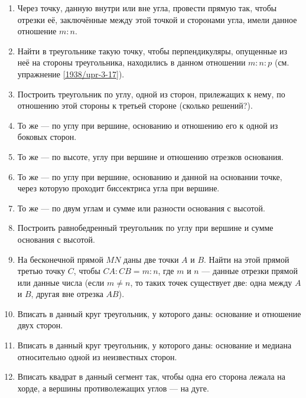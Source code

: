 \documentclass[oneside]{book}
\begin{document}
\begin{enumerate}[resume]

 \item
Через точку, данную внутри или вне угла, провести прямую так, чтобы отрезки её, заключённые между этой точкой и сторонами угла, имели данное отношение $m:n$.

 \item
Найти в треугольнике такую точку, чтобы перпендикуляры, опущенные из неё на стороны треугольника, находились в данном отношении $m:n:p$ (см. упражнение \ref{1938/upr-3-17}).

 \item
Построить треугольник по углу, одной из сторон, прилежащих к нему, по отношению этой стороны к третьей стороне (сколько решений?).

 \item
То же — по углу при вершине, основанию и отношению его к одной из боковых сторон.

 \item
То же — по высоте, углу при вершине и отношению отрезков основания.

 \item
То же — по углу при вершине, основанию и данной на основании точке, через которую проходит биссектриса угла при вершине.

 \item
То же — по двум углам и сумме или разности основания с высотой.

 \item
Построить равнобедренный треугольник по углу при вершине и сумме основания с высотой.

 \item
На бесконечной прямой $MN$ даны две точки $A$ и $B$.
Найти на этой прямой третью точку $C$, чтобы $CA:CB=m:n$, где $m$ и $n$ — данные отрезки прямой или данные числа (если $m\ne n$, то таких точек существует две:
одна между $A$ и $B$, другая вне отрезка $AB$).

 \item
Вписать в данный круг треугольник, у которого даны:
основание и отношение двух сторон.

 \item
Вписать в данный круг треугольник, у которого даны:
основание и медиана относительно одной из неизвестных сторон. %

 \item
Вписать квадрат в данный сегмент так, чтобы одна его сторона лежала на хорде, а вершины противолежащих углов — на дуге.


\end{enumerate}
\end{document}
